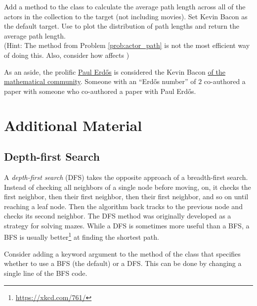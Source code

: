 \begin{problem} %
Add a method to the  class to calculate the average path length across all of the actors in the collection to the target (not including movies).
Set Kevin Bacon as the default target.
Use  to plot the distribution of path lengths and return the average path length.
\\(Hint: The  method from Problem \ref{prob:actor_path} is not the most efficient way of doing this.
Also, consider how  affects )
\end{problem}

As an aside, the prolific \href{https://en.wikipedia.org/wiki/Erd%C5%91s_number}{Paul Erd\H{o}s} is considered the Kevin Bacon \href{https://xkcd.com/599/}{of the mathematical community}.
Someone with an ``Erd\H{o}s number'' of $2$ co-authored a paper with someone who co-authored a paper with Paul Erd\H{o}s.

\newpage

\section*{Additional Material} %

\subsection*{Depth-first Search} %


A \emph{depth-first search} (DFS) takes the opposite approach of a breadth-first search.
Instead of checking all neighbors of a single node before moving, on, it checks the first neighbor, then their first neighbor, then their first neighbor, and so on until reaching a leaf node.
Then the algorithm back tracks to the previous node and checks its second neighbor.
The DFS method was originally developed as a strategy for solving mazes.
While a DFS is sometimes more useful than a BFS, a BFS is usually better\footnote{\url{https://xkcd.com/761/}} at finding the shortest path.

Consider adding a keyword argument to the  method of the  class that specifies whether to use a BFS (the default) or a DFS.
This can be done by changing a single line of the BFS code.

